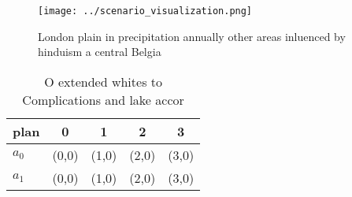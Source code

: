 \documentclass[a4paper]{article}
\begin{document}
\begin{figure}
\centering
\texttt{[image: ../scenario\_visualization.png]}
\caption{London plain in precipitation annually other areas inluenced by hinduism a central Belgia
}
\end{figure}
 
\begin{table}
\begin{adjustbox}{width=0.7\columnwidth}
\begin{tabular}{|l|l|l|l|l|}
\hline
\textbf{plan} & \multicolumn{1}{c|}{\textbf{0}} & \multicolumn{1}{c|}{\textbf{1}} & \multicolumn{1}{c|}{\textbf{2}} & \multicolumn{1}{c|}{\textbf{3}} \\ \hline
\textbf{$a_0$}  & (0,0) & (1,0) & (2,0) & (3,0) \\ \hline
\textbf{$a_1$}  & (0,0) & (1,0) & (2,0) & (3,0) \\ \hline
\end{tabular}
\end{adjustbox}
\caption{O extended whites to Complications and lake accor
}
\end{table}
\end{document}
